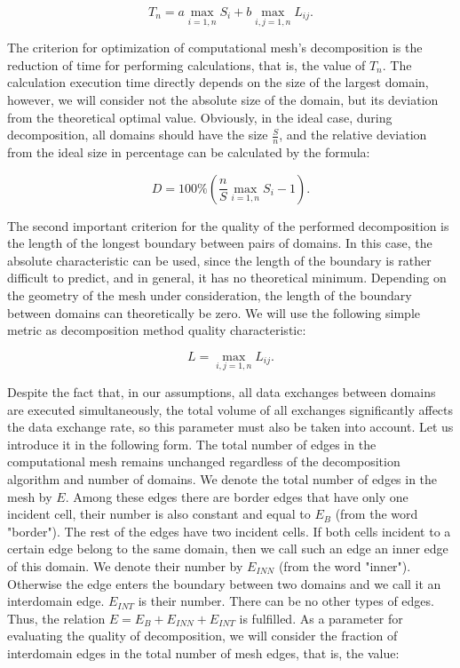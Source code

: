 \documentclass[
11pt,%
tightenlines,%
twoside,%
onecolumn,%
nofloats,%
nobibnotes,%
nofootinbib,%
superscriptaddress,%
noshowpacs,%
centertags]%
{revtex4}
\begin{document}
\begin{equation}
T_n = a \max_{i = 1,n}{S_i} + b \max_{i,j=1,n}{L_{ij}}.
\end{equation}

The criterion for optimization of computational mesh's decomposition is the reduction of time for performing calculations, that is, the value of $ T_n $.
The calculation execution time directly depends on the size of the largest domain, however, we will consider not the absolute size of the domain, but its deviation from the theoretical optimal value.
Obviously, in the ideal case, during decomposition, all domains should have the size $ \frac{S}{n} $, and the relative deviation from the ideal size in percentage can be calculated by the formula:

\begin{equation}
D = 100 \% \left( \frac{n}{S} \max_{i=1,n}{S_i} - 1 \right).
\end{equation}

The second important criterion for the quality of the performed decomposition is the length of the longest boundary between pairs of domains.
In this case, the absolute characteristic can be used, since the length of the boundary is rather difficult to predict, and in general, it has no theoretical minimum.
Depending on the geometry of the mesh under consideration, the length of the boundary between domains can theoretically be zero.
We will use the following simple metric as decomposition method quality characteristic:

\begin{equation}
L = \max_{i,j=1,n}{L_{ij}}.
\end{equation}

Despite the fact that, in our assumptions, all data exchanges between domains are executed simultaneously, the total volume of all exchanges significantly affects the data exchange rate, so this parameter must also be taken into account.
Let us introduce it in the following form.
The total number of edges in the computational mesh remains unchanged regardless of the decomposition algorithm and number of domains.
We denote the total number of edges in the mesh by $ E $.
Among these edges there are border edges that have only one incident cell, their number is also constant and equal to $ E_B $ (from the word "border").
The rest of the edges have two incident cells.
If both cells incident to a certain edge belong to the same domain, then we call such an edge an inner edge of this domain.
We denote their number by $ E_{INN} $ (from the word "inner").
Otherwise the edge enters the boundary between two domains and we call it an interdomain edge.
$ E_{INT} $ is their number.
There can be no other types of edges.
Thus, the relation $ E = E_B + E_{INN} + E_{INT} $ is fulfilled.
As a parameter for evaluating the quality of decomposition, we will consider the fraction of interdomain edges in the total number of mesh edges, that is, the value:
\end{document}
